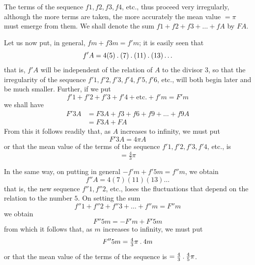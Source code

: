 The terms of the sequence $f1,f2,f3,f4$, etc., thus proceed very irregularly, although the more terms are taken, the more accurately the mean value $=\pi$ must emerge from them. We shall denote the sum $f1+f2+f3+\ldots+fA$ by $FA$.

Let us now put, in general, $fm+f3m=f'm$; it is easily seen that
\[
f'A=4(5)\mathbin{.}(7)\mathbin{.}(11)\mathbin{.}(13)\ldots
\]
that is, $f'A$ will be independent of the relation of $A$ to the divisor $3$, so that the irregularity of the sequence $f'1,f'2,f'3,f'4,f'5,f'6$, etc., will both begin later and be much smaller. Further, if we put
\[
f'1+f'2+f'3+f'4+\text{etc.}+f'm=F'm
\]
we shall have
\[
\begin{aligned}
F'3A&=F3A+f3+f6+f9+\ldots+f9A\\
&=F3A+FA
\end{aligned}
\]
From this it follows readily that, as $A$ increases to infinity, we must put
\[
F'3A=4\pi A
\]
or that the mean value of the terms of the sequence $f'1,f'2,f'3,f'4$, etc., is
\[
=\tfrac43\pi
\]

In the same way, on putting in general $-f'm+f'5m=f''m$, we obtain
\[
f''A=4(7)(11)(13)\ldots
\]
that is, the new sequence $f''1,f''2$, etc., loses the fluctuations that depend on the relation to the number $5$. On setting the sum
\[
f''1+f''2+f''3+\ldots+f''m=F''m
\]
we obtain
\[
F''5m=-F'm+F'5m
\]
from which it follows that, as $m$ increases to infinity, we must put
\[
F''5m=\tfrac43\pi\mathbin{.}4m
\]
or that the mean value of the terms of the sequence is $=\tfrac43\mathbin{.}\tfrac45\pi$.

